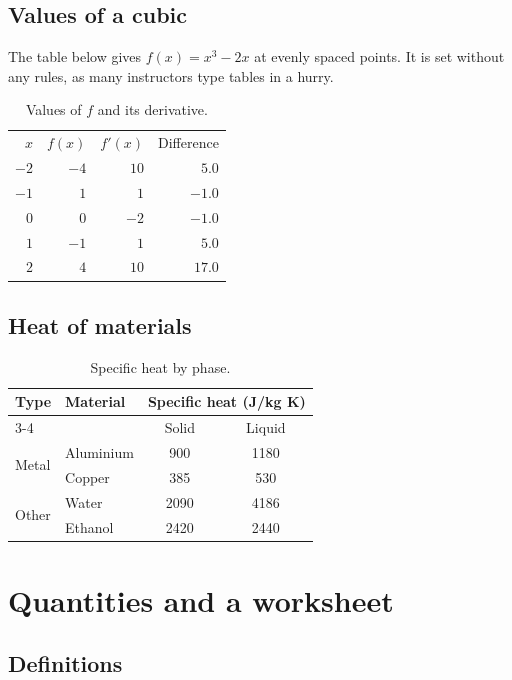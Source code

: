\documentclass[11pt]{article}
\begin{document}
\subsection{Values of a cubic}

The table below gives $f(x) = x^3 - 2x$ at evenly spaced points. It is set without any
rules, as many instructors type tables in a hurry.

\begin{table}[h]
\centering
\begin{tabular}{rrrr}
$x$ & $f(x)$ & $f'(x)$ & Difference \\[4pt]
$-2$ & $-4$ & $10$ & $5.0$ \\
$-1$ & $1$ & $1$ & $-1.0$ \\
$0$ & $0$ & $-2$ & $-1.0$ \\
$1$ & $-1$ & $1$ & $5.0$ \\
$2$ & $4$ & $10$ & $17.0$ \\
\end{tabular}
\caption{Values of $f$ and its derivative.}
\end{table}

\subsection{Heat of materials}

\begin{table}[h]
\centering
\caption{Specific heat by phase.}
\begin{tabular}{llcc}
\toprule
\multirow{2}{*}{Type} & \multirow{2}{*}{Material} & \multicolumn{2}{c}{Specific heat (J/kg K)} \\
\cmidrule(lr){3-4}
 & & Solid & Liquid \\
\midrule
\multirow{2}{*}{Metal} & Aluminium & 900 & 1180 \\
 & Copper & 385 & 530 \\
\midrule
\multirow{2}{*}{Other} & Water & 2090 & 4186 \\
 & Ethanol & 2420 & 2440 \\
\bottomrule
\end{tabular}
\end{table}

\clearpage
\section{Quantities and a worksheet}
\subsection{Definitions}
\end{document}
